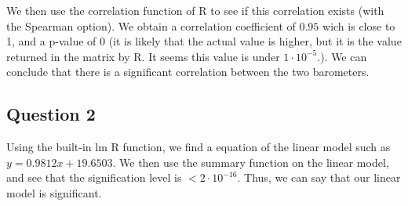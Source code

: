 \documentclass[12pt,a4paper]{article}
\begin{document}
We then use the correlation function of R to see if this correlation exists (with the Spearman option). We obtain a correlation coefficient of $0.95$ wich is close to 1, and a p-value of 0 (it is likely that the actual value is higher, but it is the value returned in the matrix by R. It seems this value is under $1\cdot 10^{-5}$.). We can conclude that there is a significant correlation between the two barometers.

\subsection*{Question 2}
Using the built-in lm R function, we find a equation of the linear model such as $y = 0.9812x + 19.6503$. We then use the summary function on the linear model, and see that the signification level is $<2 \cdot 10^{-16}$. Thus, we can say that our linear model is significant.
\end{document}
